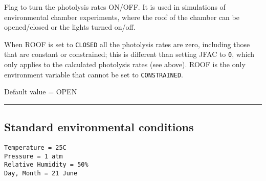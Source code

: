Flag to turn the photolysis rates ON/OFF. It is used in simulations of
environmental chamber experiments, where the roof of the chamber can be
opened/closed or the lights turned on/off.

When ROOF is set to \texttt{CLOSED} all the photolysis rates are zero,
including those that are constant or constrained; this is different than
setting JFAC to \texttt{0}, which only applies to the calculated
photolysis rates (see above). ROOF is the only environment variable that
cannot be set to \texttt{CONSTRAINED}.

Default value = OPEN

\begin{center}\rule{0.5\linewidth}{\linethickness}\end{center}

\hypertarget{standard-environmental-conditions}{%
\subsection{Standard environmental
conditions}\label{standard-environmental-conditions}}

\begin{verbatim}
Temperature = 25C  
Pressure = 1 atm  
Relative Humidity = 50%  
Day, Month = 21 June
\end{verbatim}
